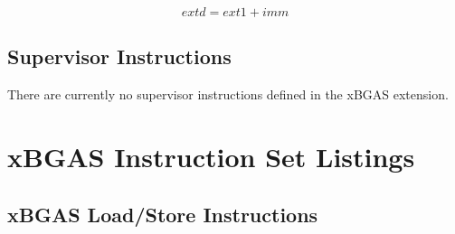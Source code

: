 \documentclass{article}
\begin{document}
\begin{equation}
extd = ext1 + imm
\end{equation}

\subsection{Supervisor Instructions}

There are currently no supervisor instructions defined in the xBGAS extension.  

\newpage
\section{xBGAS Instruction Set Listings}

\subsection{xBGAS Load/Store Instructions}
\end{document}
